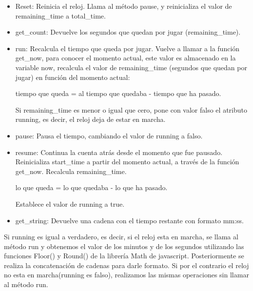 \begin{itemize}
 \item Reset: Reinicia el reloj. Llama al método pause, y reinicializa el valor de remaining\_time a total\_time.

 \item get\_count: Devuelve los segundos que quedan por jugar (remaining\_time).

 \item run: Recalcula el tiempo que queda por jugar. Vuelve a llamar a la función get\_now, para conocer el momento actual, este valor es almacenado 
en la variable now, recalcula el valor de remaining\_time (segundos que quedan por jugar) en función del momento actual:

        tiempo que queda = al tiempo que quedaba - tiempo que ha pasado.
        
Si remaining\_time es menor o igual que cero, pone con valor falso el atributo running, es decir, el reloj deja de estar en marcha.

 \item pause: Pausa el tiempo, cambiando el valor de running a falso.

 \item resume: Continua la cuenta atrás desde el momento que fue pausado. Reinicializa start\_time a partir del momento actual, a través de la 
 función get\_now. Recalcula remaining\_time.

        lo que queda = lo que quedaba - lo que ha pasado.

Establece el valor de running a true.

 \item get\_string: Devuelve una cadena con el tiempo restante con formato mm:ss.
\end{itemize}

Si running es igual a verdadero, es decir, si el reloj esta en marcha, se llama al método run y obtenemos el valor de los minutos y de los 
segundos utilizando las funciones Floor() y Round() de la librería Math de javascript. Posteriormente se realiza la concatenación de cadenas para 
darle formato. Si por el contrario el reloj no esta en marcha(running es falso), realizamos las mismas operaciones sin llamar al método run.


